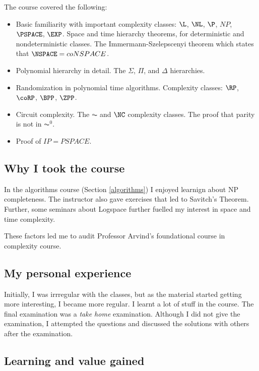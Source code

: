 \documentclass[a4paper]{amsart}
\begin{document}
The course covered the following:

\begin{itemize}

\item Basic familiarity with important complexity classes: $\L$, $\NL$, $\P$, $NP$, $\PSPACE$, $\EXP$. Space and time hierarchy theorems, for deterministic and nondeterministic
  classes. The Immermann-Szelepscenyi theorem which states that $\NSPACE = coNSPACE$.

\item Polynomial hierarchy in detail. The $\Sigma$, $\Pi$, and $\Delta$ hierarchies.

\item Randomization in polynomial time algorithms. Complexity classes: $\RP$, $\coRP$, $\BPP$, $\ZPP$. 

\item Circuit complexity. The $\AC$ and $\NC$ complexity classes. The proof 
  that parity is not in $\AC^0$.

\item Proof of $IP = PSPACE$.

\end{itemize}

\subsection{Why I took the course}

In the algorithms course (Section \ref{algorithms}) I enjoyed learnign about NP completeness. The instructor also gave exercises
that led to Savitch's Theorem. Further, some seminars about Logspace further fuelled my interest in space and time complexity.

These factors led me to audit Professor Arvind's foundational course in complexity course.

\subsection{My personal experience}

Initially, I was irrregular with the classes, but as the material started getting more interesting, I became more regular. I learnt
a lot of stuff in the course. The final examination was a {\em take home} examination. Although I did not give the examination, I attempted
the questions and discussed the solutions with others after the examination.
 
\subsection{Learning and value gained}
\end{document}
